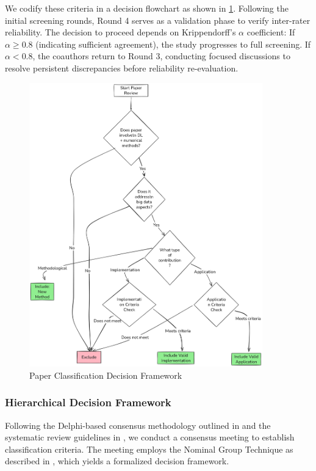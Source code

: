 \documentclass[acmsmall]{acmart}
\begin{document}
We codify these criteria in a decision flowchart as shown in \cref{fig:decision-flow2}. Following the initial screening rounds, Round 4 serves as a validation phase to verify inter-rater reliability. The decision to proceed depends on Krippendorff's $\alpha$ coefficient: If $\alpha \geq 0.8$ (indicating sufficient agreement), the study progresses to full screening. If $\alpha < 0.8$, the coauthors return to Round 3, conducting focused discussions to resolve persistent discrepancies before reliability re-evaluation.

\begin{figure}
    \centering
    \includegraphics[width=0.9\textwidth]{media/Company Structure.png}
    \caption{Paper Classification Decision Framework}
    \label{fig:decision-flow2}
\end{figure}

\subsubsection{Hierarchical Decision Framework}\label{subsubsec:phase-2-literature-search-and-study-selection:hierarchical-decision-framework}
Following the Delphi-based consensus methodology outlined in \citet{dalkey1969delphi} and the systematic review guidelines in  \citet{kitchenham2004procedures}, we conduct a  consensus meeting to establish classification criteria. The meeting employs the Nominal Group Technique as described in \citet{delbecq1971group}, which yields a formalized decision framework.
\end{document}
